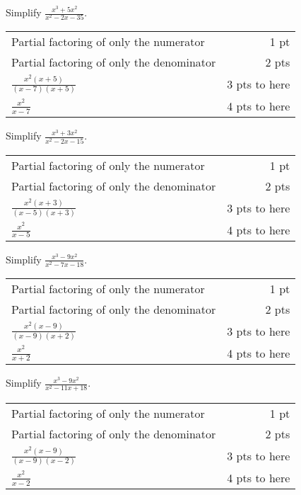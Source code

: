 {
	Simplify $\displaystyle \frac{x^3+5x^2}{x^2-2x-35}$.
}
{
	\begin{tabular}{l r}
	Partial factoring of only the numerator & 1 pt\\
	Partial factoring of only the denominator & 2 pts\\
	$\displaystyle \frac{x^2(x+5)}{(x-7)(x+5)}$ & 3 pts to here\\[10pt]
	$\displaystyle \frac{x^2}{x-7}$ & 4 pts to here\\
	\end{tabular}
}

{
	Simplify $\displaystyle \frac{x^3+3x^2}{x^2-2x-15}$.
}
{
	\begin{tabular}{l r}
	Partial factoring of only the numerator & 1 pt\\
	Partial factoring of only the denominator & 2 pts\\
	$\displaystyle \frac{x^2(x+3)}{(x-5)(x+3)}$ & 3 pts to here\\[10pt]
	$\displaystyle \frac{x^2}{x-5}$ & 4 pts to here\\
	\end{tabular}
}

{
	Simplify $\displaystyle \frac{x^3-9x^2}{x^2-7x-18}$.
}
{
	\begin{tabular}{l r}
	Partial factoring of only the numerator & 1 pt\\
	Partial factoring of only the denominator & 2 pts\\
	$\displaystyle \frac{x^2(x-9)}{(x-9)(x+2)}$ & 3 pts to here\\[10pt]
	$\displaystyle \frac{x^2}{x+2}$ & 4 pts to here\\
	\end{tabular}
}

{
	Simplify $\displaystyle \frac{x^3-9x^2}{x^2-11x+18}$.
}
{
	\begin{tabular}{l r}
	Partial factoring of only the numerator & 1 pt\\
	Partial factoring of only the denominator & 2 pts\\
	$\displaystyle \frac{x^2(x-9)}{(x-9)(x-2)}$ & 3 pts to here\\[10pt]
	$\displaystyle \frac{x^2}{x-2}$ & 4 pts to here\\
	\end{tabular}
}
